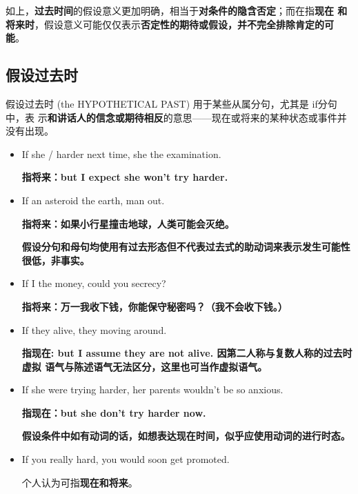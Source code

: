如上，\textbf{过去时间}的假设意义更加明确，相当于\textbf{对条件的隐含否定}；而在指\textbf{现在
  和将来时}，假设意义可能仅仅表示\textbf{否定性的期待或假设，并不完全排除肯定的可
  能}。

\subsection{假设过去时}

假设过去时 (the HYPOTHETICAL PAST) 用于某些从属分句，尤其是 if分句中，表
示\textbf{和讲话人的信念或期待相反}的意思——现在或将来的某种状态或事件并没有出现。

\begin{itemize}
\item If she  /  harder next time, she  the examination.

  \textbf{指将来：but I expect she won't try harder.}

\item If an asteroid  the earth, man  out.

  \textbf{指将来：如果小行星撞击地球，人类可能会灭绝。}

  \textbf{假设分句和母句均使用有过去形态但不代表过去式的助动词来表示发生可能性很低，非事实。}

\item If I  the money, could you  secrecy?

  \textbf{指将来：万一我收下钱，你能保守秘密吗？（我不会收下钱。）}

\item If they  alive, they  moving around.

  \textbf{指现在: but I assume they are not alive. 因第二人称与复数人称的过去时虚拟
    语气与陈述语气无法区分，这里也可当作虚拟语气。}

\item If she were trying harder, her parents wouldn't be so anxious.

  \textbf{指现在：but she don't try harder now.}

  \textbf{假设条件中如有动词的话，如想表达现在时间，似乎应使用动词的进行时态。}

\item If you really  hard, you would soon get promoted.

  个人认为可指\textbf{现在和将来}。
\end{itemize}



